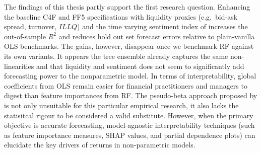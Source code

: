 The findings of this thesis partly support the first research question. Enhancing the baseline C4F and  FF5 specifications with liquidity proxies (e.g.\ bid-ask spread, turnover, $ILLQ$) and the time varying sentiment index of  increases the out-of-sample $R^{2}$ and reduces hold out set forecast errors relative to plain-vanilla OLS benchmarks.  The gains, however, disappear once we benchmark RF against its own variants. It appears the tree ensemble already captures the same non-linearities and that liquidity and sentiment does not seem to significantly add forecasting power to the nonparametric model. In terms of interpretability, global coefficients from OLS remain easier for financial practitioners and managers to digest than feature importances from RF. The pseudo-beta approach proposed by  is not only unsuitable for this particular empirical research, it also lacks the statisitcal rigour to be considered a valid substitute. However, when the primary objective is accurate forecasting, model-agnostic interpretability techniques (such as feature importance measures, SHAP values, and partial dependence plots) can elucidate the key drivers of returns in non-parametric models.



